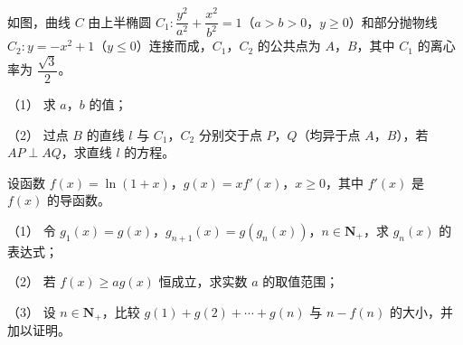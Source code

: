 \begin{question}
如图，曲线 $C$ 由上半椭圆 $C_1:\dfrac{y^2}{a^2}+\dfrac{x^2}{b^2}=1$（$a>b>0$，$y\geqslant 0$）和部分抛物线 $C_2:y=-x^2+1$（$y\leqslant 0$）连接而成，$C_1$，$C_2$ 的公共点为 $A$，$B$，其中 $C_1$ 的离心率为 $\dfrac{\sqrt3}{2}$。
\nopagebreak[4]
\begin{center}\end{center}
\nopagebreak[4]
（1） 求 $a$，$b$ 的值；

（2） 过点 $B$ 的直线 $l$ 与 $C_1$，$C_2$ 分别交于点 $P$，$Q$（均异于点 $A$，$B$），若 $AP\perp AQ$，求直线 $l$ 的方程。

\end{question}
\begin{question}
设函数 $f(x)=\ln(1+x)$，$g(x)=xf'(x)$，$x\geqslant 0$，其中 $f'(x)$ 是 $f(x)$ 的导函数。

（1） 令 $g_1(x)=g(x)$，$g_{n+1}(x)=g(g_n(x))$，$n\in\mathbf N_+$，求 $g_n(x)$ 的表达式；

（2） 若 $f(x)\geqslant ag(x)$ 恒成立，求实数 $a$ 的取值范围；

（3） 设 $n\in\mathbf N_+$，比较 $g(1)+g(2)+\cdots+g(n)$ 与 $n-f(n)$ 的大小，并加以证明。

\end{question}